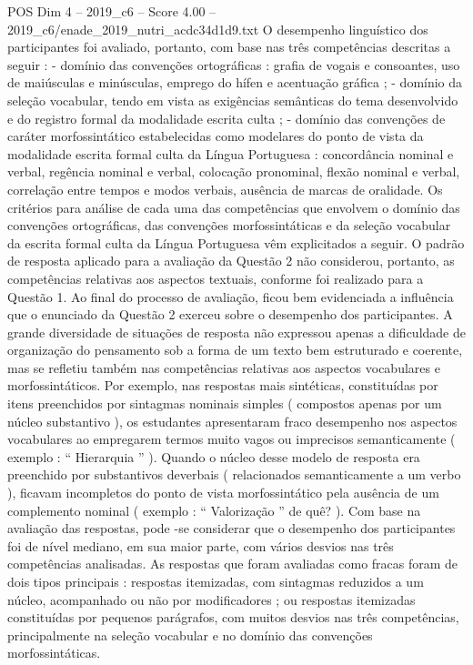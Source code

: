 \begin{textsample}{POS Dim 4 – 2019\_c6 – Score 4.00 – 2019\_c6/enade\_2019\_nutri\_acdc34d1d9.txt}
O desempenho linguístico dos participantes foi avaliado, portanto, com base nas três competências descritas a seguir : - domínio das convenções ortográficas : grafia de vogais e consoantes, uso de maiúsculas e minúsculas, emprego do hífen e acentuação gráfica ; - domínio da seleção vocabular, tendo em vista as exigências semânticas do tema desenvolvido e do registro formal da modalidade escrita culta ; - domínio das convenções de caráter morfossintático estabelecidas como modelares do ponto de vista da modalidade escrita formal culta da Língua Portuguesa : concordância nominal e verbal, regência nominal e verbal, colocação pronominal, flexão nominal e verbal, correlação entre tempos e modos verbais, ausência de marcas de oralidade.
Os critérios para análise de cada uma das competências que envolvem o domínio das convenções ortográficas, das convenções morfossintáticas e da seleção vocabular da escrita formal culta da Língua Portuguesa vêm explicitados a seguir.
O padrão de resposta aplicado para a avaliação da Questão 2 não considerou, portanto, as competências relativas aos aspectos textuais, conforme foi realizado para a Questão 1.
Ao final do processo de avaliação, ficou bem evidenciada a influência que o enunciado da Questão 2 exerceu sobre o desempenho dos participantes.
A grande diversidade de situações de resposta não expressou apenas a dificuldade de organização do pensamento sob a forma de um texto bem estruturado e coerente, mas se refletiu também nas competências relativas aos aspectos vocabulares e morfossintáticos.
Por exemplo, nas respostas mais sintéticas, constituídas por itens preenchidos por sintagmas nominais simples ( compostos apenas por um núcleo substantivo ), os estudantes apresentaram fraco desempenho nos aspectos vocabulares ao empregarem termos muito vagos ou imprecisos semanticamente ( exemplo : “ Hierarquia ” ).
Quando o núcleo desse modelo de resposta era preenchido por substantivos deverbais ( relacionados semanticamente a um verbo ), ficavam incompletos do ponto de vista morfossintático pela ausência de um complemento nominal ( exemplo : “ Valorização ” de quê? ).
Com base na avaliação das respostas, pode -se considerar que o desempenho dos participantes foi de nível mediano, em sua maior parte, com vários desvios nas três competências analisadas.
As respostas que foram avaliadas como fracas foram de dois tipos principais : respostas itemizadas, com sintagmas reduzidos a um núcleo, acompanhado ou não por modificadores ; ou respostas itemizadas constituídas por pequenos parágrafos, com muitos desvios nas três competências, principalmente na seleção vocabular e no domínio das convenções morfossintáticas.

\end{textsample}
